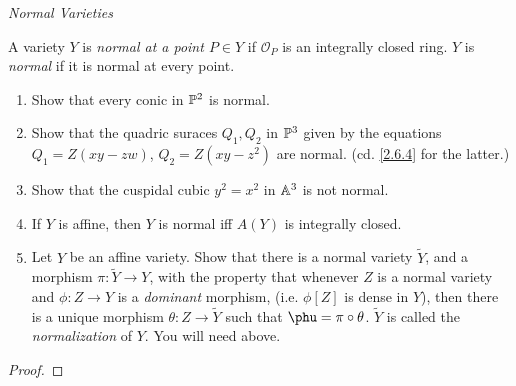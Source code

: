 \label{1.3.17}

\emph{Normal Varieties}

A variety $Y$ is \emph{normal at a point $P \in Y$} if $\mathcal O_P$ is an integrally closed ring. $Y$ is \emph{normal} if it is normal at every point.

\begin{enumerate}[label = (\alph*)]
    \item Show that every conic in $\P^2$ is normal.

    \item Show that the quadric suraces $Q_1, Q_2$ in $\P^3$ given by the equations $Q_1 = Z(xy - zw)$, $Q_2 = Z(xy - z^2)$ are normal. (cd. \ref{2.6.4} for the latter.)

    \item Show that the cuspidal cubic $y^2 = x^2$ in $\A^3$ is not normal.

    \item If $Y$ is affine, then $Y$ is normal iff $A(Y)$ is integrally closed.

    \item Let $Y$ be an affine variety. Show that there is a normal variety $\widetilde{Y}$, and a morphism $\pi: \widetilde{Y} \longrightarrow Y$, with the property that whenever $Z$ is a normal variety and $\phi: Z \longrightarrow Y$ is a \emph{dominant} morphism, (i.e. $\phi[Z]$ is dense in $Y$), then there is a unique morphism $\theta: Z \longrightarrow \widetilde{Y}$ such that $\phu = \pi \circ \theta$. $\widetilde{Y}$ is called the \emph{normalization} of $Y$. You will need \cite[I.3.9A]{hartshorne} above.
\end{enumerate}

\begin{proof}

\end{proof}
